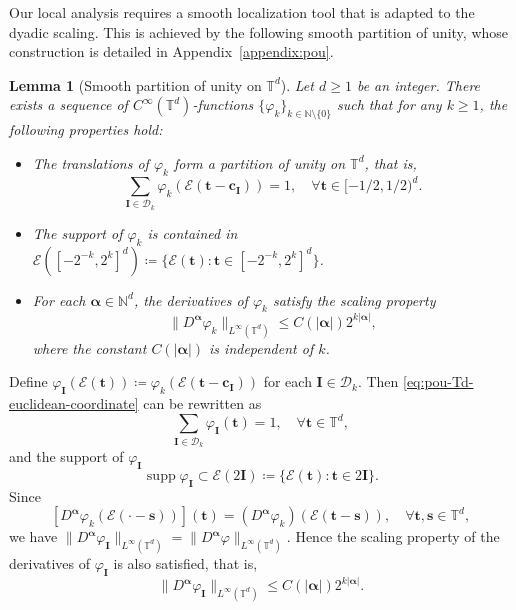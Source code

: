 \documentclass[12pt]{amsart}
\newtheorem{lemma}[theorem]{Lemma}
\theoremstyle{definition}
\theoremstyle{remark}
\newcommand{\bt}{\boldsymbol{t}}
\newcommand{\bs}{\boldsymbol{s}}
\newcommand{\N}{\mathbb{N}}
\newcommand{\T}{\mathbb{T}}
\newcommand{\supp}{\operatorname{supp}}
\numberwithin{equation}{section}
\begin{document}
Our local analysis requires a smooth localization tool that is adapted to the dyadic scaling. This is achieved by the following smooth partition of unity, whose construction is detailed in Appendix~\ref{appendix:pou}.
\begin{lemma}[Smooth partition of unity on $\T^d$]\label{lemma:pou-scaling-Td}
	Let $d\ge 1$ be an integer. There exists a sequence of $C^\infty(\T^d)$-functions $\{\varphi_k\}_{k\in \N\setminus\{0\}}$ such that for any $k\ge 1$, the following properties hold:  
	\begin{itemize}
		\item[(1)] The translations of $\varphi_k$ form a partition of unity on $\T^d$, that is,
		\begin{equation}\label{eq:pou-Td-euclidean-coordinate}
			\sum_{\boldsymbol{I}\in \mathscr{D}_k} \varphi_{k}(\mathcal{E}(\bt-\boldsymbol{c_I}))=1,\quad \forall \bt\in [-1/2,1/2)^d.
		\end{equation}
		\item[(2)] The support of $\varphi_k$ is contained in $\mathcal{E}([-2^{-k},2^{k}]^d)\coloneq \{\mathcal{E}(\bt):\bt\in [-2^{-k},2^{k}]^d \}$.
		\item[(3)] For each $\boldsymbol{\alpha}\in \N^d$, the derivatives of $\varphi_k$ satisfy the scaling property
		\[
		\|D^{\boldsymbol{\alpha}} \varphi_k\|_{L^\infty(\T^d)}\le C(|\boldsymbol{\alpha}|) 2^{k|\boldsymbol{\alpha}|},
		\]
		where the constant $C(|\boldsymbol{\alpha}|)$ is independent of $k$.
	\end{itemize}
\end{lemma}

Define $\varphi_{\boldsymbol{I}}(\mathcal{E}(\bt))\coloneq\varphi_k(\mathcal{E}(\bt-\boldsymbol{c_I}))$ for each $\boldsymbol{I}\in \mathscr{D}_k$. Then \eqref{eq:pou-Td-euclidean-coordinate} can be rewritten as
\[
\sum_{\boldsymbol{I}\in \mathscr{D}_k} \varphi_{\boldsymbol{I}}(\bt)=1,\quad \forall \bt\in \T^d,
\]
and the support of $\varphi_{\boldsymbol{I}}$
\[
\supp \varphi_{\boldsymbol{I}}\subset \mathcal{E}(2\boldsymbol{I})\coloneq \{\mathcal{E}(\bt):\bt\in 2\boldsymbol{I}\}.
\]
Since 
\[
[D^{\boldsymbol{\alpha}}\varphi_k(\mathcal{E}(\cdot-\bs))](\bt)=(D^{\boldsymbol{\alpha}}\varphi_k)(\mathcal{E}(\bt-\bs)),\quad \forall \bt,\bs\in \T^d,
\]
we have $\|D^{\boldsymbol{\alpha}}\varphi_{\boldsymbol{I}}\|_{L^\infty(\T^d)}=\|D^{\boldsymbol{\alpha}}\varphi\|_{L^\infty(\T^d)}$. Hence the scaling property of the derivatives of $\varphi_{\boldsymbol{I}}$ is also satisfied, that is,
\[
\|D^{\boldsymbol{\alpha}} \varphi_{\boldsymbol{I}}\|_{L^\infty(\T^d)}\le C(|\boldsymbol{\alpha}|) 2^{k|\boldsymbol{\alpha}|}.
\]
\end{document}
